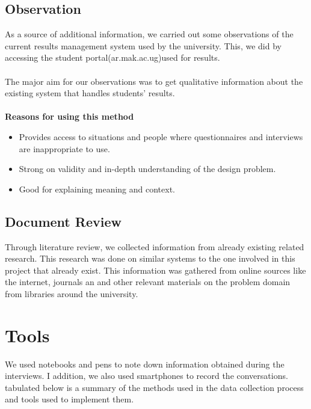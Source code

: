 \subsection{Observation}
As a source of additional information, we carried out some observations of the current results management system used by the university. This, we did by accessing the student portal(ar.mak.ac.ug)used for results. \\~\\
The major aim for our observations was to get qualitative information about the existing system that handles students’ results.\\~\\

\textbf{Reasons for using this method}
\begin{itemize}
\item Provides access to situations and people where questionnaires and interviews are inappropriate to use.
\item Strong on validity and in-depth understanding of the design problem.
\item Good for explaining meaning and context.
\end{itemize}


\subsection{Document Review}
Through literature review, we collected information from already existing related research. This research was done on similar systems to the one involved in this project that already exist. This information was gathered from online sources like the internet, journals an and other relevant materials on the problem domain from libraries around the university.

\section{Tools}
We used notebooks and pens to note down information obtained during the interviews. I addition, we also used smartphones to record the conversations. tabulated below is a summary of the methods used in the data collection process and tools used to implement them.\\~\\

